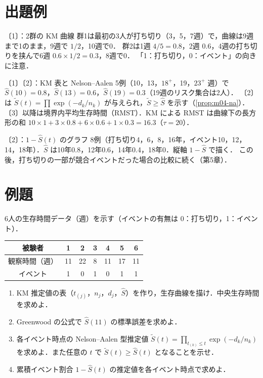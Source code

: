 \section{出題例}\label{sec:m04-shutsudai}
\begin{shutsudai}{〔1〕：2群の KM 曲線}
群1は最初の3人が打ち切り（3，5，7週）で，曲線は9週まで1のまま，9週で $1/2$，10週で0．
群2は1週 $4/5=0.8$，2週 $0.6$，4週の打ち切りを挟んで6週 $0.6\times1/2=0.3$，8週で0．
「1：打ち切り，0：イベント」の向きに注意．
\end{shutsudai}
\begin{shutsudai}{〔1〕〔2〕：KM 表と Nelson--Aalen}
5例（10，13，$18^+$，19，$23^+$ 週）で $\hat S(10)=0.8$，$\hat S(13)=0.6$，$\hat S(19)=0.3$（19週のリスク集合は2人）．
〔2〕は $\tilde S(t)=\prod\exp(-d_k/n_k)$ が与えられ，$\tilde S\ge\hat S$ を示す（\cref{prop:m04-na}）．
〔3〕以降は境界内平均生存時間（RMST）．KM による RMST は曲線下の長方形の和 $10\times1+3\times0.8+6\times0.6+1\times0.3=16.3$（$\tau=20$）．
\end{shutsudai}
\begin{shutsudai}{〔2〕：$1-\hat S(t)$ のグラフ}
8例（打ち切り4，6，8，16年，イベント10，12，14，18年）．$\hat S$ は10年0.8，12年0.6，14年0.4，18年0．縦軸 $1-\hat S$ で描く．
この後，打ち切りの一部が競合イベントだった場合の比較に続く（第5章）．
\end{shutsudai}

\section{例題}\label{sec:m04-reidai}
\begin{reidai}\label{reidai:m04-1}
6人の生存時間データ（週）を示す（イベントの有無は 0：打ち切り，1：イベント）．
\begin{center}\small
\begin{tabular}{@{}ccccccc@{}}
\toprule
被験者 & 1 & 2 & 3 & 4 & 5 & 6\\
\midrule
観察時間（週） & 11 & 22 & 8 & 11 & 17 & 11\\
イベント & 1 & 0 & 1 & 0 & 1 & 1\\
\bottomrule
\end{tabular}
\end{center}
\begin{enumerate}[label=〔\arabic*〕]
\item KM 推定値の表（$t_{(j)}$，$n_j$，$d_j$，$\hat S$）を作り，生存曲線を描け．中央生存時間を求めよ．
\item Greenwood の公式で $\hat S(11)$ の標準誤差を求めよ．
\item 各イベント時点の Nelson--Aalen 型推定値 $\tilde S(t)=\prod_{t_{(k)}\le t}\exp(-d_k/n_k)$ を求めよ．また任意の $t$ で $\tilde S(t)\ge\hat S(t)$ となることを示せ．
\item 累積イベント割合 $1-\hat S(t)$ の推定値を各イベント時点で求めよ．
\end{enumerate}
\end{reidai}

